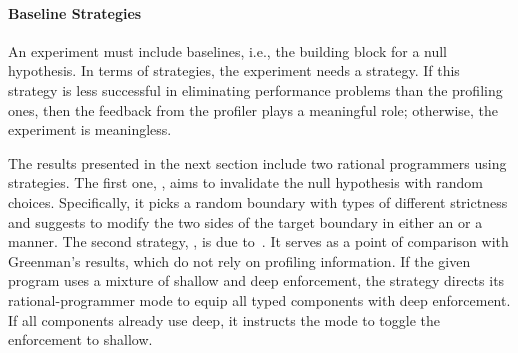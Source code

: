 \paragraph{Baseline Strategies} An experiment must include baselines, i.e., the
 building block for a null hypothesis. In terms of strategies, the experiment
 needs a \agnostickw{} strategy.  If this \agnostickw{} strategy is less
 successful in eliminating performance problems than the profiling ones, then
 the feedback from the profiler plays a meaningful role; otherwise, the
 experiment is meaningless.

The results presented in the next section include two rational programmers using
 \agnostickw{} strategies. The first one, \randkw{}, aims to invalidate the null
 hypothesis with random choices. Specifically, it picks a random boundary with
 types of different strictness and suggests to modify the two sides of the
 target boundary in either an \optkw{} or a \conkw{} manner.  The second
 \agnostickw{} strategy, \togglekw{}, is due to~\citet{g-deep-shallow}. It
 serves as a point of comparison with Greenman's results, which do not rely on
 profiling information. If the given program uses a mixture of shallow and deep
 enforcement, the strategy directs its rational-programmer mode to equip all
 typed components with deep enforcement. If all components already use deep, it
 instructs the mode to toggle the enforcement to shallow.
